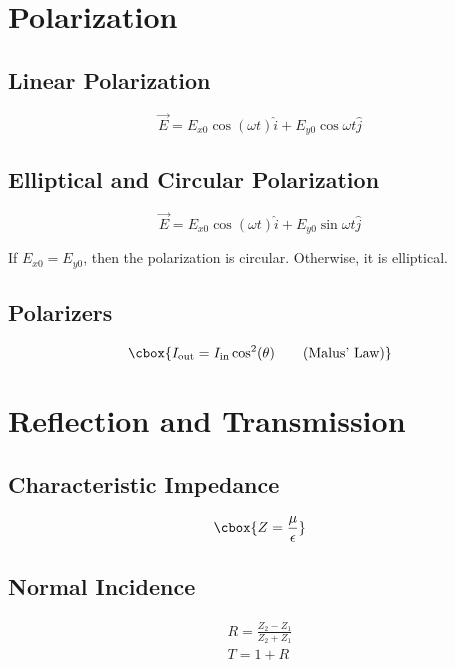 \documentclass{hw}
\numberwithin{equation}{section}
\begin{document}
\section{Polarization}
\subsection{Linear Polarization}
\begin{equation}
  \vec{E} = E_{x0} \cos(\omega t)\hat{i} + E_{y0} \cos{\omega t}\hat{j}
\end{equation}

\subsection{Elliptical and Circular Polarization}
\begin{equation}
  \vec{E} = E_{x0} \cos(\omega t)\hat{i} + E_{y0} \sin{\omega t}\hat{j}
\end{equation}

If $E_{x0} = E_{y0}$, then the polarization is circular. Otherwise, it is
elliptical.

\subsection{Polarizers}
\begin{equation}
  \cbox{I_{\text{out}} = I_{\text{in}} \cos^2(\theta) \tag{Malus' Law}}
\end{equation}

\section{Reflection and Transmission}
\subsection{Characteristic Impedance}
\begin{equation}
  \cbox{Z = \frac{\mu}{\epsilon}}
\end{equation}

\subsection{Normal Incidence}
\begin{gather}
  R = \frac{Z_2 - Z_1}{Z_2 + Z_1} \\
  T = 1 + R
\end{gather}
\end{document}
